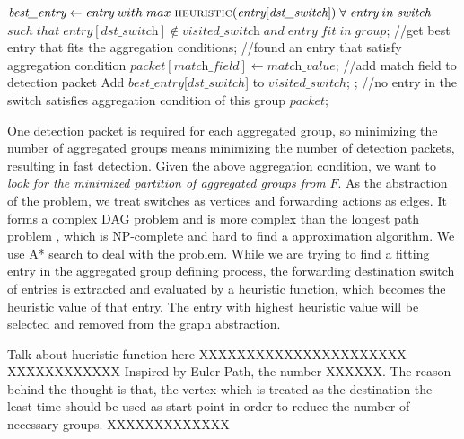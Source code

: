 \begin {tcolorbox}[blanker,float=tbp,
grow to left by=1cm, grow to right by=1cm]
\begin{algorithm}[H]
  \begin{algorithmic}[1]
      \State $\textit{best\_entry} \gets \textit{entry}\;with\;max\; \Call{heuristic}{\textit{entry}[\textit{dst\_switch}]}\;\forall\;\textit{entry}\;in\;\textit{switch}$
      \State $such\;that\;\textit{entry}[\textit{dst\_switch}] \notin \textit{visited\_switch}\;and\;\textit{entry}\;fit\;in\;group$;  //get best entry that fits the aggregation conditions;
        //found an entry that satisfy aggregation condition
        \State $\textit{packet}[\textit{match\_field}] \gets \textit{match\_value}$;  //add match field to detection packet
        \State Add $best\_entry$[$dst\_switch$] to $visited\_switch$;
        \State \Return {};  //no entry in the switch satisfies aggregation condition of this group
      \EndIf
      \State \Return $packet$;
    \EndFunction
  \end{algorithmic}
\end{algorithm}
\end{tcolorbox}

One detection packet is required for each aggregated group, so minimizing the number of aggregated groups means minimizing the number of detection packets, resulting in fast detection. Given the above aggregation condition, we want to \textit{look for the minimized partition of aggregated groups from} $F$. As the abstraction of the problem, we treat switches as vertices and forwarding actions as edges. It forms a complex DAG problem and is more complex than the longest path problem \cite{DMR97,RU04}, which is NP-complete and hard to find a approximation algorithm. We use A* search to deal with the problem. While we are trying to find a fitting entry in the aggregated group defining process, the forwarding destination switch of entries is extracted and evaluated by a heuristic function, which becomes the heuristic value of that entry. The entry with highest heuristic value will be selected and removed from the graph abstraction.

Talk about hueristic function here XXXXXXXXXXXXXXXXXXXXXX
XXXXXXXXXXXX Inspired by Euler Path, the number XXXXXX. The reason behind the thought is that, the vertex which is treated as the destination the least time should be used as start point in order to reduce the number of necessary groups.
XXXXXXXXXXXXX

